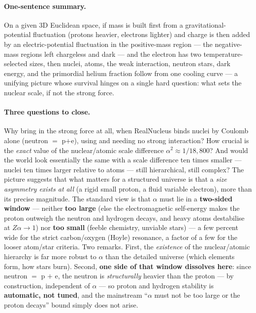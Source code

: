 \documentclass[11pt]{article}
\begin{document}
\paragraph{One-sentence summary.} On a given 3D Euclidean space, if mass is built first from a
gravitational-potential fluctuation (protons heavier, electrons lighter) and charge is then added by an
electric-potential fluctuation in the positive-mass region --- the negative-mass regions left chargeless
and dark --- and the electron has two temperature-selected sizes, then nuclei, atoms, the weak
interaction, neutron stars, dark energy, and the primordial helium fraction follow from one cooling curve
--- a unifying picture whose survival
hinges on a single hard question: what sets the nuclear scale, if not the strong force.

\paragraph{Three questions to close.} Why bring in the strong force at all, when RealNucleus binds nuclei
by Coulomb alone (neutron $=$ p$+$e), using and needing no strong interaction? How crucial is the
\emph{exact} value of the nuclear/atomic scale difference $\alpha^2\approx1/18{,}800$? And would the world
look essentially the same with a scale difference ten times smaller --- nuclei ten times larger relative to
atoms --- still hierarchical, still complex? The picture suggests that what matters for a structured
universe is that a \emph{size asymmetry exists at all} (a rigid small proton, a fluid variable electron),
more than its precise magnitude. The standard view is that $\alpha$ must lie in a \textbf{two-sided window}
--- neither \textbf{too large} (else the electromagnetic self-energy makes the proton outweigh the neutron
and hydrogen decays, and heavy atoms destabilise at $Z\alpha\to1$) nor \textbf{too small} (feeble chemistry,
unviable stars) --- a few percent wide for the strict carbon/oxygen (Hoyle) resonance, a factor of a few for
the looser atom/star criteria. Two remarks. First, the \emph{existence} of the nuclear/atomic hierarchy is
far more robust to $\alpha$ than the detailed universe (which elements form, how stars burn). Second,
\textbf{one side of that window dissolves here}: since neutron $=$ p $+$ e, the neutron is
\emph{structurally} heavier than the proton --- by construction, independent of $\alpha$ --- so proton and
hydrogen stability is \textbf{automatic, not tuned}, and the mainstream ``$\alpha$ must not be too large or
the proton decays'' bound simply does not arise.
\end{document}
